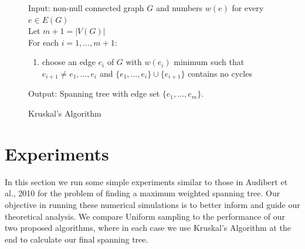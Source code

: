 \documentclass[11.75pt,oneside]{amsart}
\begin{document}
\begin{figure}[ht]
\raggedright
Input: non-null connected graph $G$ and numbers $w(e)$ for every $e \in E(G)$\\
\vspace{5pt}
Let $m+1=|V(G)|$\\
\vspace{10pt}
For each $i = 1,\hdots,m+1$:\\\vspace{5pt}
\begin{enumerate}
\item{choose an edge $e_i$ of $G$ with $w(e_i)$ minimum such that $e_{i+1} \neq e_1,\hdots,e_{i}$ and $\{e_1,\hdots,e_i\} \cup \{e_{i+1}\}$ contains no cycles}
\end{enumerate}
\vspace{5pt}
Output: Spanning tree with edge set $\{e_1,\hdots,e_{m}\}$.
\caption{\label{kruskal} Kruskal's Algorithm}
\end{figure}


\section{Experiments} \label{sec:exp}
In this section we run some simple experiments similar to those in Audibert et al., 2010 \cite{ABM10} for the problem of finding a maximum weighted spanning tree. Our objective in running these numerical simulations is to better inform and guide our theoretical analysis. We compare Uniform sampling to the performance of our two proposed algorithms, where in each case we use Kruskal's Algorithm at the end to calculate our final spanning tree.\\ 
\end{document}

